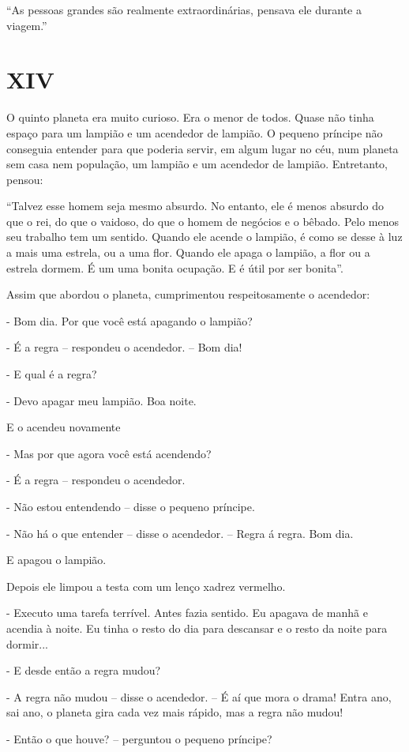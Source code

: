 ``As pessoas grandes são realmente extraordinárias, pensava ele durante
a viagem.''

\chapter{XIV}

O quinto planeta era muito curioso. Era o menor de todos. Quase não
tinha espaço para um lampião e um acendedor de lampião. O pequeno
príncipe não conseguia entender para que poderia servir, em algum lugar
no céu, num planeta sem casa nem população, um lampião e um acendedor de
lampião. Entretanto, pensou:

``Talvez esse homem seja mesmo absurdo. No entanto, ele é menos absurdo
do que o rei, do que o vaidoso, do que o homem de negócios e o bêbado.
Pelo menos seu trabalho tem um sentido. Quando ele acende o lampião, é
como se desse à luz a mais uma estrela, ou a uma flor. Quando ele apaga
o lampião, a flor ou a estrela dormem. É um uma bonita ocupação. E é
útil por ser bonita''.

Assim que abordou o planeta, cumprimentou respeitosamente o acendedor:

- Bom dia. Por que você está apagando o lampião?

- É a regra -- respondeu o acendedor. -- Bom dia!

- E qual é a regra?

- Devo apagar meu lampião. Boa noite.

E o acendeu novamente

- Mas por que agora você está acendendo?

- É a regra -- respondeu o acendedor.

- Não estou entendendo -- disse o pequeno príncipe.

- Não há o que entender -- disse o acendedor. -- Regra á regra. Bom dia.

E apagou o lampião.

Depois ele limpou a testa com um lenço xadrez vermelho.

- Executo uma tarefa terrível. Antes fazia sentido. Eu apagava de manhã
e acendia à noite. Eu tinha o resto do dia para descansar e o resto da
noite para dormir...

- E desde então a regra mudou?

- A regra não mudou -- disse o acendedor. -- É aí que mora o drama!
Entra ano, sai ano, o planeta gira cada vez mais rápido, mas a regra não
mudou!

- Então o que houve? -- perguntou o pequeno príncipe?

